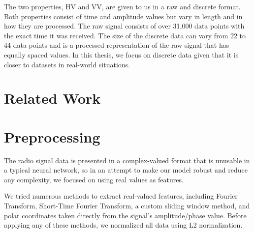 \documentclass{turabian-thesis}
\begin{document}
The two properties, HV and VV, are given to us in a raw and discrete format. Both properties consist of time and amplitude values but vary in length and in how they are processed. The raw signal consists of over 31,000 data points with the exact time it was received. The size of the discrete data can vary from 22 to 44 data points and is a processed representation of the raw signal that has equally spaced values. In this thesis, we focus on discrete data given that it is closer to datasets in real-world situations.


\chapter{Related Work}
\label{chap:relatedwork}

\chapter{Preprocessing}
\label{chap:preprocessing}

The radio signal data is presented in a complex-valued format that is unusable in a typical neural network, so in an attempt to make our model robust and reduce any complexity, we focused on using real values as features.

We tried numerous methods to extract real-valued features, including Fourier Transform, Short-Time Fourier Transform, a custom sliding window method, and polar coordinates taken directly from the signal's amplitude/phase value. Before applying any of these methods, we normalized all data using L2 normalization.


\end{document}
